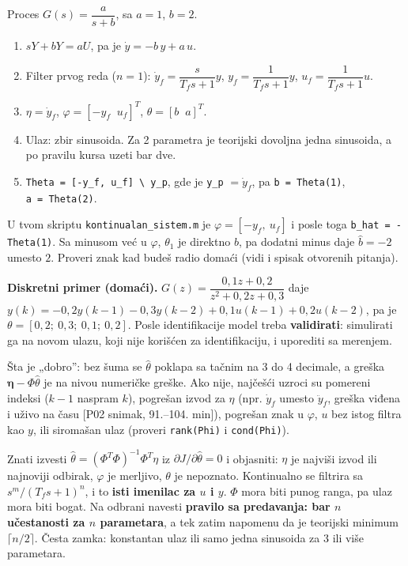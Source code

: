 \documentclass[11pt,a4paper,parskip=half,headsepline,numbers=noenddot]{scrartcl}
\DeclareRobustCommand{\izvor}[1]{{\small\color{izvorC}[#1]}}
\begin{document}
Proces \(G(s) = \dfrac{a}{s + b}\), sa \(a = 1\), \(b = 2\).

\begin{enumerate}
\def\labelenumi{\arabic{enumi}.}
\item \(sY + bY = aU\), pa je \(\dot y = -b\,y + a\,u\).
\item Filter prvog reda (\(n = 1\)): \(\dot y_f = \dfrac{s}{T_fs+1}y\), \(y_f = \dfrac{1}{T_fs+1}y\), \(u_f = \dfrac{1}{T_fs+1}u\).
\item \(\eta = \dot y_f\), \(\varphi = [-y_f\;\; u_f]^T\), \(\theta = [b\;\; a]^T\).
\item Ulaz: zbir sinusoida. Za 2 parametra je teorijski dovoljna jedna sinusoida, a po pravilu kursa uzeti bar dve.
\item \texttt{Theta\ =\ {[}-y\_\allowbreak{}f,\allowbreak{}\ u\_\allowbreak{}f{]}\ \textbackslash{}\ y\_\allowbreak{}p}, gde je \texttt{y\_p} \(= \dot y_f\), pa \texttt{b\ =\ Theta(\allowbreak{}1)}, \texttt{a\ =\ Theta(\allowbreak{}2)}.
\end{enumerate}

U tvom skriptu \texttt{kontinualan\_\allowbreak{}sistem.m} je \(\varphi = [-y_f,\ u_f]\) i posle toga \texttt{b\_\allowbreak{}hat\ =\ -Theta(\allowbreak{}1)}. Sa minusom već u \(\varphi\), \(\theta_1\) je direktno \(b\), pa dodatni minus daje \(\hat b = -2\) umesto \(2\). Proveri znak kad budeš radio domaći (vidi i spisak otvorenih pitanja).

\textbf{Diskretni primer (domaći).} \(G(z) = \dfrac{0{,}1z + 0{,}2}{z^2 + 0{,}2z + 0{,}3}\) daje \(y(k) = -0{,}2y(k-1) - 0{,}3y(k-2) + 0{,}1u(k-1) + 0{,}2u(k-2)\), pa je \(\theta = [0{,}2;\ 0{,}3;\ 0{,}1;\ 0{,}2]\). Posle identifikacije model treba \textbf{validirati}: simulirati ga na novom ulazu, koji nije korišćen za identifikaciju, i uporediti sa merenjem.

Šta je „dobro'': bez šuma se \(\hat\theta\) poklapa sa tačnim na 3 do 4 decimale, a greška \(\boldsymbol\eta - \Phi\hat\theta\) je na nivou numeričke greške. Ako nije, najčešći uzroci su pomereni indeksi (\(k-1\) naspram \(k\)), pogrešan izvod za \(\eta\) (npr. \(\dot y_f\) umesto \(\ddot y_f\), greška viđena i uživo na času \izvor{P02 snimak, 91.--104. min}), pogrešan znak u \(\varphi\), \(u\) bez istog filtra kao \(y\), ili siromašan ulaz (proveri \texttt{rank(Phi)} i \texttt{cond(Phi)}).

\begin{ispit}
Znati izvesti \(\hat\theta = (\Phi^T\Phi)^{-1}\Phi^T\eta\) iz \(\partial J/\partial\hat\theta = 0\) i objasniti: \(\eta\) je najviši izvod ili najnoviji odbirak, \(\varphi\) je merljivo, \(\theta\) je nepoznato. Kontinualno se filtrira sa \(s^m/(T_fs+1)^n\), i to \textbf{isti imenilac za \(u\) i \(y\)}. \(\Phi\) mora biti punog ranga, pa ulaz mora biti bogat. Na odbrani navesti \textbf{pravilo sa predavanja: bar \(n\) učestanosti za \(n\) parametara}, a tek zatim napomenu da je teorijski minimum \(\lceil n/2\rceil\). Česta zamka: konstantan ulaz ili samo jedna sinusoida za 3 ili više parametara.
\end{ispit}
\end{document}
